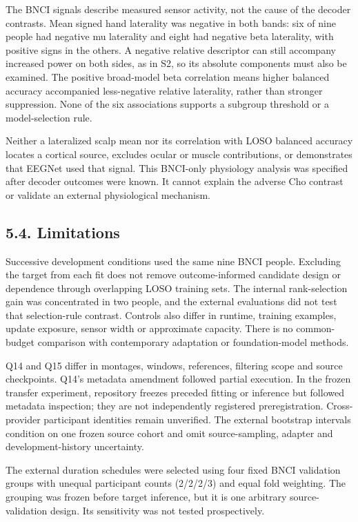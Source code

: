 \documentclass[11pt]{article}
\begin{document}
The BNCI signals describe measured sensor activity, not the cause of the decoder contrasts. Mean signed hand laterality was negative in both bands: six of nine people had negative mu laterality and eight had negative beta laterality, with positive signs in the others. A negative relative descriptor can still accompany increased power on both sides, as in S2, so its absolute components must also be examined. The positive broad-model beta correlation means higher balanced accuracy accompanied less-negative relative laterality, rather than stronger suppression. None of the six associations supports a subgroup threshold or a model-selection rule.

Neither a lateralized scalp mean nor its correlation with LOSO balanced accuracy locates a cortical source, excludes ocular or muscle contributions, or demonstrates that EEGNet used that signal. This BNCI-only physiology analysis was specified after decoder outcomes were known. It cannot explain the adverse Cho contrast or validate an external physiological mechanism.

\subsection*{5.4. Limitations}
Successive development conditions used the same nine BNCI people. Excluding the target from each fit does not remove outcome-informed candidate design or dependence through overlapping LOSO training sets. The internal rank-selection gain was concentrated in two people, and the external evaluations did not test that selection-rule contrast. Controls also differ in runtime, training examples, update exposure, sensor width or approximate capacity. There is no common-budget comparison with contemporary adaptation or foundation-model methods.

Q14 and Q15 differ in montages, windows, references, filtering scope and source checkpoints. Q14's metadata amendment followed partial execution. In the frozen transfer experiment, repository freezes preceded fitting or inference but followed metadata inspection; they are not independently registered preregistration. Cross-provider participant identities remain unverified. The external bootstrap intervals condition on one frozen source cohort and omit source-sampling, adapter and development-history uncertainty.

The external duration schedules were selected using four fixed BNCI validation groups with unequal participant counts (2/2/2/3) and equal fold weighting. The grouping was frozen before target inference, but it is one arbitrary source-validation design. Its sensitivity was not tested prospectively.
\end{document}
